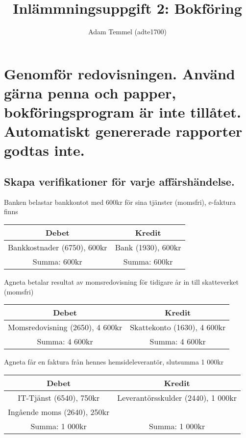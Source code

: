 \documentclass[a4paper, titlepage,12pt]{article}
\title{Inlämmningsuppgift 2: Bokföring}
\author{Adam Temmel (adte1700)}
\begin{document}
	\maketitle

	\section{Genomför redovisningen. Använd gärna penna och papper, bokföringsprogram är inte tillåtet. Automatiskt genererade rapporter godtas inte.}
		\subsection{Skapa verifikationer för varje affärshändelse.}
			Banken belastar bankkontot med 600kr för sina tjänster (momsfri), e-faktura finns
			\begin{center}
				\begin{tabular}{|c|c|}
					\hline
					\textbf{Debet} & \textbf{Kredit} \\
					\hline
					Bankkostnader (6750), 600kr & Bank (1930), 600kr\\
					\hline
					Summa: 600kr & Summa: 600kr\\
					\hline
				\end{tabular}
			\end{center}


			Agneta betalar resultat av momsredovisning för tidigare år in till skatteverket (momsfri)
			\begin{center}
				\begin{tabular}{|c|c|}
					\hline
					\textbf{Debet} & \textbf{Kredit} \\
					\hline
					Momsredovisning (2650), 4 600kr & Skattekonto (1630), 4 600kr\\
					\hline
					Summa: 4 600kr & Summa: 4 600kr\\
					\hline
				\end{tabular}
			\end{center}


			Agneta får en faktura från hennes hemsideleverantör, slutsumma 1 000kr
			\begin{center}
				\begin{tabular}{|c|c|}
					\hline
					\textbf{Debet} & \textbf{Kredit} \\
					\hline
					IT-Tjänst (6540), 750kr & Leverantörsskulder (2440), 1 000kr\\
					\hline
					Ingående moms (2640), 250kr & \\
					\hline
					Summa: 1 000kr & Summa: 1 000kr\\
					\hline
				\end{tabular}
			\end{center}
			
\end{document}
